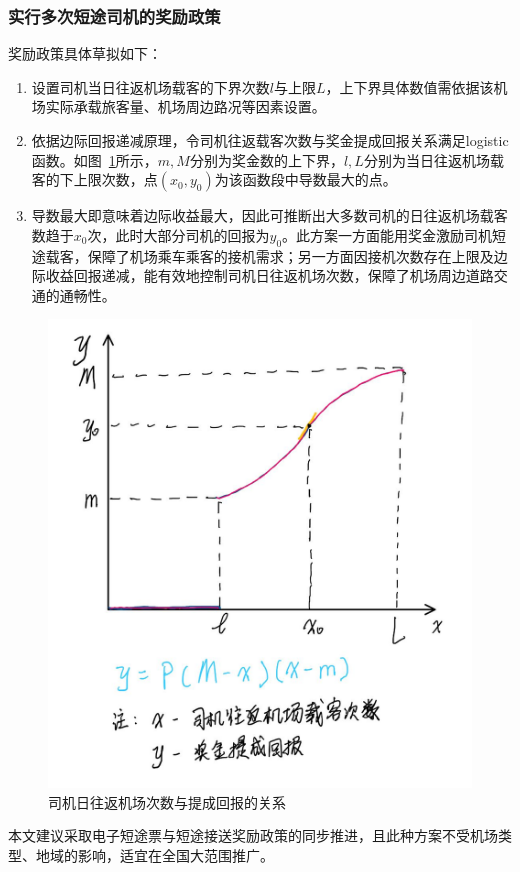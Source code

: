\subsubsection{实行多次短途司机的奖励政策}
奖励政策具体草拟如下：

\begin{enumerate} %
    \item 设置司机当日往返机场载客的下界次数$l$与上限$L$，上下界具体数值需依据该机场实际承载旅客量、机场周边路况等因素设置。
    
    \item 依据边际回报递减原理，令司机往返载客次数与奖金提成回报关系满足logistic函数。如图~\ref{fig:logistic}所示，$m,M$分别为奖金数的上下界，$l,L$分别为当日往返机场载客的下上限次数，点$(x_0,y_0)$为该函数段中导数最大的点。
    
    \item 导数最大即意味着边际收益最大，因此可推断出大多数司机的日往返机场载客数趋于$x_0$次，此时大部分司机的回报为$y_0$。此方案一方面能用奖金激励司机短途载客，保障了机场乘车乘客的接机需求；另一方面因接机次数存在上限及边际收益回报递减，能有效地控制司机日往返机场次数，保障了机场周边道路交通的通畅性。
\end{enumerate}

\begin{figure}
    \centering
    \includegraphics[width=.6\textwidth]{figures/logistic.jpg}
    \caption{司机日往返机场次数与提成回报的关系}
    \label{fig:logistic}
\end{figure}

本文建议采取电子短途票与短途接送奖励政策的同步推进，且此种方案不受机场类型、地域的影响，适宜在全国大范围推广。